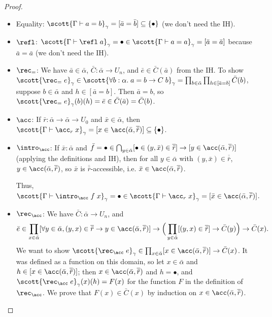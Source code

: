 \begin{proof}
\begin{itemize}
\item Equality: $\scott{\Gamma\vdash a=b}_\gamma=[\bar a=\bar b]\subseteq\{\bullet\}$ (we don't need the IH).
\item $\refl$: $\scott{\Gamma\vdash \refl\;a}_\gamma=\bullet\in\scott{\Gamma\vdash a=a}_\gamma=[\bar a=\bar a]$ because $\bar a=\bar a$ (we don't need the IH).
\item $\rec_=$: We have $\bar a\in\bar\alpha$, $\bar C:\bar\alpha\to U_n$, and $\bar e\in\bar C(\bar a)$ from the IH. To show $\scott{\rec_=\;e}_\gamma\in\scott{\forall b:\alpha.\;a=b\to C\;b}_\gamma=\prod_{b\in\bar\alpha}\prod_{h\in[\bar a=b]}\bar C(b)$, suppose $b\in\bar\alpha$ and $h\in[\bar a=b]$. Then $\bar a=b$, so $\scott{\rec_=\;e}_\gamma(b)(h)=\bar e\in \bar C(\bar a)=\bar C(b)$.
\item $\acc$: If $\bar r:\bar\alpha\to\bar\alpha\to U_0$ and $\bar x\in\bar\alpha$, then $\scott{\Gamma\vdash\acc_r\;x}_\gamma=[x\in\acc(\bar\alpha,\overline{\bar r})]\subseteq\{\bullet\}$.
\item $\intro_\acc$: If $\bar x:\bar\alpha$ and $\bar f=\bullet\in\bigcap_{y\in\bar\alpha}[\bullet\in (y,\bar x)\in\overline{\bar r}]\to[y\in\acc(\bar\alpha,\overline{\bar r})]$ (applying the definitions and IH), then for all $y\in\bar\alpha$ with $(y,\bar x)\in\overline{\bar r}$, $y\in\acc(\bar\alpha,\overline{\bar r})$, so $\bar x$ is $\overline{\bar r}$-accessible, i.e. $\bar x\in\acc(\bar\alpha,\overline{\bar r})$.

Thus, $\scott{\Gamma\vdash\intro_\acc\;f\;x}_\gamma=\bullet\in\scott{\Gamma\vdash\acc_r\;x}_\gamma=[\bar x\in\acc(\bar\alpha,\overline{\bar r})]$.
\item $\rec_\acc$: We have $\bar C:\bar\alpha\to U_n$, and
$$\bar e\in\prod_{x\in\bar\alpha}[\forall y\in\bar\alpha,(y,x)\in\overline{\bar r}\to y\in\acc(\bar\alpha,\overline{\bar r})]\to\Big(\prod_{y\in\bar\alpha}[(y,x)\in\overline{\bar r}]\to\bar C(y)\Big)\to\bar C(x).$$
We want to show $\scott{\rec_\acc\;e}_\gamma\in\prod_{x\in\bar\alpha}[x\in\acc(\bar\alpha,\overline{\bar r})]\to\bar C(x)$. It was defined as a function on this domain, so let $x\in\bar\alpha$ and $h\in[x\in\acc(\bar\alpha,\overline{\bar r})]$; then $x\in\acc(\bar\alpha,\overline{\bar r})$ and $h=\bullet$, and $\scott{\rec_\acc\;e}_\gamma(x)(h)=F(x)$ for the function $F$ in the definition of $\rec_\acc$. We prove that $F(x)\in\bar C(x)$ by induction on $x\in\acc(\bar\alpha,\overline{\bar r})$.


\end{itemize}
\end{proof}
